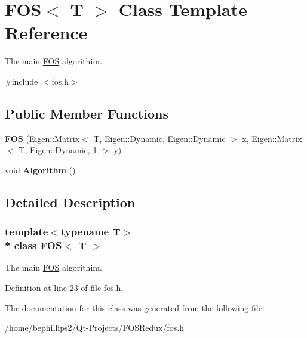 \hypertarget{class_f_o_s}{}\section{F\+OS$<$ T $>$ Class Template Reference}
\label{class_f_o_s}


The main \hyperlink{class_f_o_s}{F\+OS} algorithim.  




{\ttfamily \#include $<$fos.\+h$>$}

\subsection*{Public Member Functions}
\begin{DoxyCompactItemize}
\item 
{\bfseries F\+OS} (Eigen\+::\+Matrix$<$ T, Eigen\+::\+Dynamic, Eigen\+::\+Dynamic $>$ x, Eigen\+::\+Matrix$<$ T, Eigen\+::\+Dynamic, 1 $>$ y)\hypertarget{class_f_o_s_afe9890a8ccc16999cb8175539ae6eedd}{}\label{class_f_o_s_afe9890a8ccc16999cb8175539ae6eedd}

\item 
void {\bfseries Algorithm} ()\hypertarget{class_f_o_s_a18a5f85f95eb2cefe26fb25d13127c38}{}\label{class_f_o_s_a18a5f85f95eb2cefe26fb25d13127c38}

\end{DoxyCompactItemize}


\subsection{Detailed Description}
\subsubsection*{template$<$typename T$>$\\*
class F\+O\+S$<$ T $>$}

The main \hyperlink{class_f_o_s}{F\+OS} algorithim. 

Definition at line 23 of file fos.\+h.



The documentation for this class was generated from the following file\+:\begin{DoxyCompactItemize}
\item 
/home/bephillips2/\+Qt-\/\+Projects/\+F\+O\+S\+Redux/fos.\+h\end{DoxyCompactItemize}
